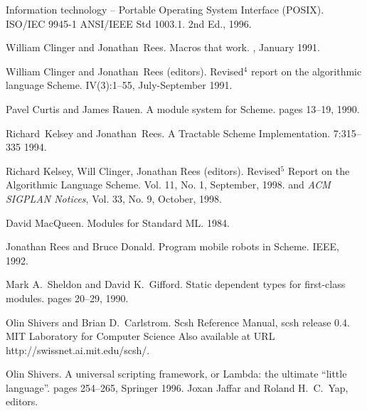 
\begin{thebibliography}{10}
\addtocounter{chapter}{1}
\T{}

Information technology -- Portable Operating System Interface (POSIX).
\newblock ISO/IEC 9945-1 ANSI/IEEE Std 1003.1.
\newblock 2nd Ed., 1996.

William Clinger and Jonathan~Rees.
\newblock Macros that work.
, January 1991.

William Clinger and Jonathan~Rees (editors).
\newblock Revised${}^4$ report on the algorithmic language {S}cheme.
 IV(3):1--55, July-September 1991.

Pavel Curtis and James Rauen.
\newblock A module system for Scheme.
pages 13--19, 1990.

Richard~Kelsey and Jonathan~Rees.
\newblock A Tractable {Scheme} Implementation.
 7:315--335 1994.

Richard Kelsey, Will Clinger, Jonathan Rees (editors).
\newblock Revised$^5$ Report on the Algorithmic Language Scheme.
 Vol. 11, No. 1,
 September, 1998.
\newblock and {\em ACM SIGPLAN Notices}, Vol. 33, No. 9, October, 1998.

David MacQueen.
\newblock Modules for Standard ML.
1984.

Jonathan Rees and Bruce Donald.
\newblock Program mobile robots in Scheme.
 IEEE, 1992. 

Mark A.~Sheldon and David K.~Gifford.
\newblock Static dependent types for first-class modules.
pages 20--29, 1990.

Olin Shivers and Brian D.~Carlstrom.
\newblock Scsh Reference Manual, scsh release 0.4.
\newblock MIT Laboratory for Computer Science
\newblock Also available at URL http://swissnet.ai.mit.edu/scsh/.

Olin Shivers.
\newblock A universal scripting framework, 
 or Lambda: the ultimate ``little language''.
 pages 254--265, Springer 1996.
\newblock Joxan Jaffar and Roland H.~C.~Yap, editors.

\end{thebibliography}
